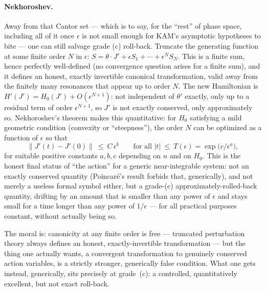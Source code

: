 \paragraph{Nekhoroshev.} Away from that Cantor set --- which is to say, for the
``rest'' of phase space, including all of it once $\epsilon$ is not small
enough for KAM's asymptotic hypotheses to bite --- one can still salvage grade
(c) roll-back. Truncate the generating function at some finite order $N$ in
$\epsilon$: $S=\theta\cdot J'+\epsilon S_1+\cdots+\epsilon^N S_N$. This is a
finite sum, hence perfectly well-defined (no convergence question arises for a
finite sum), and it defines an honest, exactly invertible canonical
transformation, valid away from the finitely many resonances that appear up to
order $N$. The new Hamiltonian is $H'(J')=H_0(J')+O(\epsilon^{N+1})$: not
independent of $\theta'$ exactly, only up to a residual term of order
$\epsilon^{N+1}$, so $J'$ is not exactly conserved, only approximately so.
Nekhoroshev's theorem makes this quantitative: for $H_0$ satisfying a mild
geometric condition (convexity or ``steepness''), the order $N$ can be
optimized as a function of $\epsilon$ so that
\begin{equation}
\big\|J'(t)-J'(0)\big\|\ \le\ C\,\epsilon^{b}\qquad\text{for all }|t|\ 
    \le\ T(\epsilon)=\exp\!\big(c/\epsilon^{a}\big),
\label{nekhoroshev}
\end{equation}
for suitable positive constants $a,b,c$ depending on $n$ and on $H_0$. This is
the honest final status of ``the action'' for a generic near-integrable system:
not an exactly conserved quantity (Poincar\'e's result forbids that,
generically), and not merely a useless formal symbol either, but a grade-(c)
approximately-rolled-back quantity, drifting by an amount that is smaller than
any power of $\epsilon$ and stays small for a time longer than any power of
$1/\epsilon$ --- for all practical purposes constant, without actually being
so.

The moral is: canonicity
at any finite order is free --- truncated perturbation theory always defines an
honest, exactly-invertible transformation --- but the thing one actually wants,
a convergent transformation to genuinely conserved action variables, is a
strictly stronger, generically false condition. What one gets instead,
generically, sits precisely at grade~(c): a controlled, quantitatively
excellent, but not exact roll-back.

